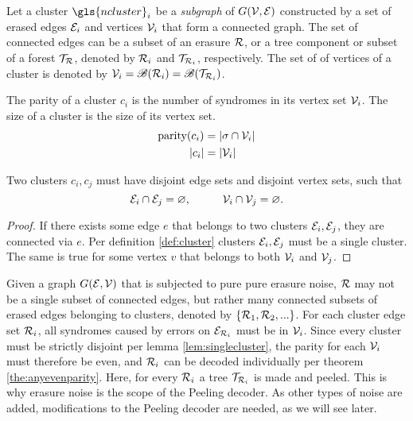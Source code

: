 \begin{definition}\label{def:cluster}
  Let a cluster $\gls{ncluster}_i$ be a \emph{subgraph} of $G(\mathcal{V},\mathcal{E})$ constructed by a set of erased edges $\mathcal{E}_i$ and vertices $\mathcal{V}_i$ that form a connected graph. The set of connected edges can be a subset of an erasure $\mathcal{R}$, or a tree component or subset of a forest $\mathcal{T}_{\mathcal{R}}$, denoted by $\mathcal{R}_i$ and $\mathcal{T}_{\mathcal{R}_i}$, respectively. The set of of vertices of a cluster is denoted by $\mathcal{V}_i = \mathscr{B}(\mathcal{R}_i) = \mathscr{B}(\mathcal{T}_{\mathcal{R}_i})$.
\end{definition}
\begin{definition}\label{def:clusterparity}
  The parity of a cluster $c_i$ is the number of syndromes in its vertex set $\mathcal{V}_i$. The size of a cluster is the size of its vertex set. 
  \begin{align}\label{eq:clusterparity}
    \text{parity}(c_i) &= \abs{\sigma \cap \mathcal{V}_i} \\
    \abs{c_i} &= \abs{\mathcal{V}_i}
  \end{align}
\end{definition}
\begin{lemma}\label{lem:singlecluster}
  Two clusters $c_i, c_j$ must have disjoint edge sets and disjoint vertex sets, such that
  \begin{equation}
    \mathcal{E}_i\cap \mathcal{E}_j = \varnothing, \hspace{1cm} \mathcal{V}_i\cap \mathcal{V}_j=\varnothing.
  \end{equation}
\end{lemma}
\begin{proof}
  If there exists some edge $e$ that belongs to two clusters $\mathcal{E}_i, \mathcal{E}_j$, they are connected via $e$. Per definition \ref{def:cluster} clusters $\mathcal{E}_i, \mathcal{E}_j$ must be a single cluster. The same is true for some vertex $v$ that belongs to both $\mathcal{V}_i$ and $\mathcal{V}_j$.
\end{proof}
Given a graph $G(\mathcal{E},\mathcal{V})$ that is subjected to pure pure erasure noise, $\mathcal{R}$ may not be a single subset of connected edges, but rather many connected subsets of erased edges belonging to clusters, denoted by $\{\mathcal{R}_1, \mathcal{R}_2,...\}$. For each cluster edge set $\mathcal{R}_i$, all syndromes caused by errors on $\mathcal{E}_{\mathcal{R}_i}$ must be in $\mathcal{V}_i$. Since every cluster must be strictly disjoint per lemma \ref{lem:singlecluster}, the parity for each $\mathcal{V}_i$ must therefore be even, and $\mathcal{R}_i$ can be decoded individually per theorem \ref{the:anyevenparity}. Here, for every $\mathcal{R}_i$ a tree $\mathcal{T}_{\mathcal{R}_i}$ is made and peeled. This is why erasure noise is the scope of the Peeling decoder. As other types of noise are added, modifications to the Peeling decoder are needed, as we will see later.
